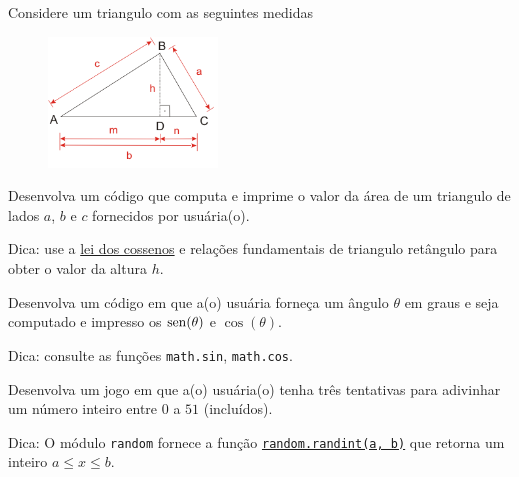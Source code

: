 \begin{exer}
  Considere um triangulo com as seguintes medidas
  \begin{figure}[H]
    \centering
    \includegraphics[width=0.4\textwidth]{./cap_fun/dados/fig_leiDosCossenos/fig}
  \end{figure}
  Desenvolva um código que computa e imprime o valor da área de um triangulo de lados $a$, $b$ e $c$ fornecidos por usuária(o).
\end{exer}
\begin{resp}
  Dica: use a \href{https://pt.wikipedia.org/wiki/Lei_dos_cossenos}{lei dos cossenos} e relações fundamentais de triangulo retângulo para obter o valor da altura $h$. 
\end{resp}

\begin{exer}
  Desenvolva um código em que a(o) usuária forneça um ângulo $\theta$ em graus e seja computado e impresso os $\operatorname{sen}(\theta)$ e $\cos(\theta)$.
\end{exer}
\begin{resp}
  Dica: consulte as funções \lstinline+math.sin+, \lstinline+math.cos+.
\end{resp}

\begin{exer}
  Desenvolva um jogo em que a(o) usuária(o) tenha três tentativas para adivinhar um número inteiro entre $0$ a $51$ (incluídos). 
\end{exer}
\begin{resp}
  Dica: O módulo \lstinline+random+ fornece a função \href{https://docs.python.org/3/library/random.html?highlight=random#random.randint}{\lstinline+random.randint(a, b)+} que retorna um inteiro $a \leq x \leq b$.
\end{resp}

